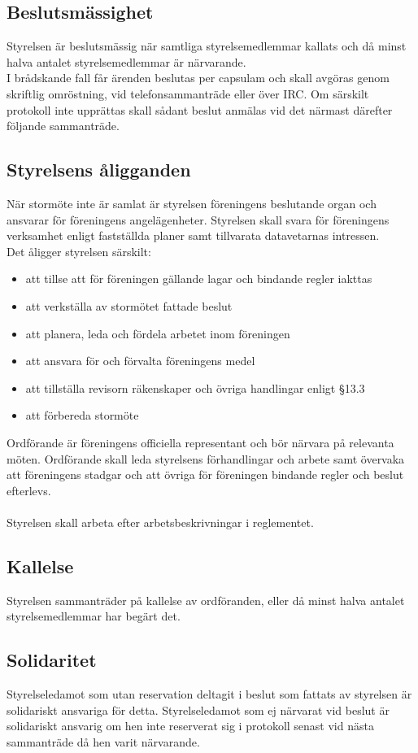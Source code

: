 \documentclass[a4paper]{article}
\begin{document}
{{  \subsection{Beslutsmässighet}
  Styrelsen är beslutsmässig när samtliga styrelsemedlemmar kallats och då minst halva antalet styrelsemedlemmar är närvarande.\\
  I brådskande fall får ärenden beslutas per capsulam och skall avgöras genom skriftlig omröstning, vid telefonsammanträde eller över IRC. Om särskilt protokoll inte upprättas skall sådant beslut anmälas vid det närmast därefter följande sammanträde.
  \subsection{Styrelsens åligganden}
  När stormöte inte är samlat är styrelsen föreningens beslutande organ och ansvarar för föreningens angelägenheter. Styrelsen skall svara för föreningens verksamhet enligt fastställda planer samt tillvarata datavetarnas intressen.\\
  Det åligger styrelsen särskilt:
  \begin{itemize}
  \item att tillse att för föreningen gällande lagar och bindande regler iakttas
  \item att verkställa av stormötet fattade beslut
  \item att planera, leda och fördela arbetet inom föreningen
  \item att ansvara för och förvalta föreningens medel
  \item att tillställa revisorn räkenskaper och övriga handlingar enligt §13.3
  \item att förbereda stormöte
  \end{itemize}
  Ordförande är föreningens officiella representant och bör närvara på relevanta möten. Ordförande skall leda styrelsens förhandlingar och arbete samt övervaka att föreningens stadgar och att övriga för föreningen bindande regler och beslut efterlevs.\\
  \\
  Styrelsen skall arbeta efter arbetsbeskrivningar i reglementet.
  \subsection{Kallelse}
  Styrelsen sammanträder på kallelse av ordföranden, eller då minst halva antalet styrelsemedlemmar har begärt det.
  \subsection{Solidaritet}
  Styrelseledamot som utan reservation deltagit i beslut som fattats av styrelsen är solidariskt ansvariga för detta. Styrelseledamot som ej närvarat vid beslut är solidariskt ansvarig om hen inte reserverat sig i protokoll senast vid nästa sammanträde då hen varit närvarande.}
}
\end{document}
